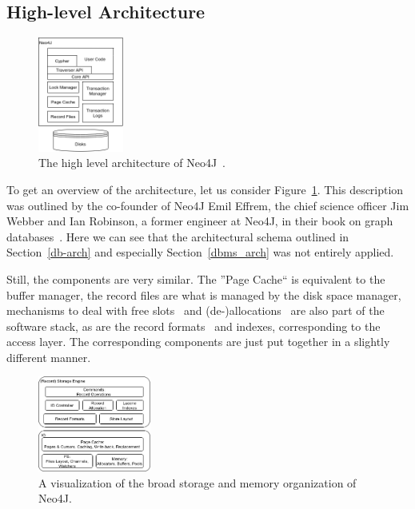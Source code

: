     \subsection{High-level Architecture}
        \begin{figure}[htp]
            \begin{center}
                \includegraphics[keepaspectratio,width=0.25\textwidth]{img/04-databases/N4J_HLA_Emil.png}
            \end{center}
            \caption{The high level architecture of Neo4J~\autocite{robinson2015graph}.} 
            \label{N4J_HLA_Emil}
        \end{figure}
        
        To get an overview of the architecture, let us consider Figure~\ref{N4J_HLA_Emil}.
        This description was outlined by the co-founder of Neo4J Emil Effrem, the chief science officer Jim Webber and Ian Robinson, a former engineer at Neo4J, in their book on graph databases~\autocite{robinson2015graph}.
        Here we can see that the architectural schema outlined in Section~\ref{db-arch} and especially Section~\ref{dbms_arch} was not entirely applied.
        
        Still, the components are very similar.
        The ''Page Cache`` is equivalent to the buffer manager, the record files are what is managed by the disk space manager, mechanisms to deal with free slots~\autocite{neo4jidgenerator} and (de-)allocations~\autocite{neo4jio} are also part of the software stack, as are the record formats~\autocite{neo4jrecordstorage} and indexes, corresponding to the access layer. 
        The corresponding components are just put together in a slightly different manner. 
        
        \begin{figure}[htp]
            \begin{center}
                \includegraphics[keepaspectratio,width=0.33\textwidth,height=0.3\textheight]{img/04-databases/N4J_Storage.png}
            \end{center}
            \caption{A visualization of the broad storage and memory organization of Neo4J.} \label{N4J_Storage}
        \end{figure}
        
